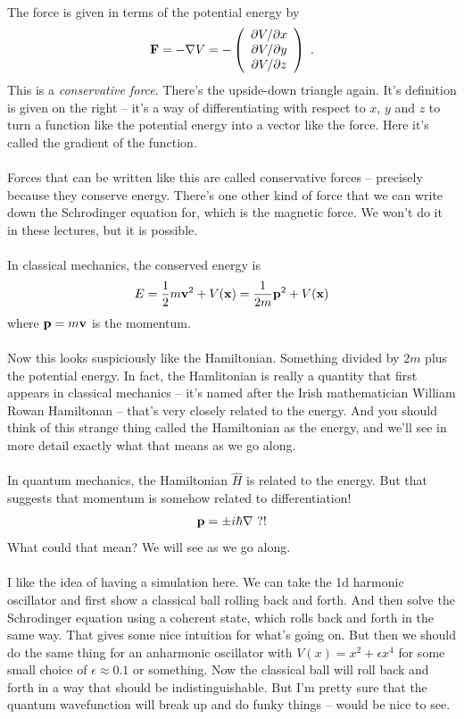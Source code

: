 \documentclass[12pt]{article}
\def\be{\begin{eqnarray}}
\def\ee{\end{eqnarray}}
\newcommand{\nn}{\nonumber}
\newcommand\para{\paragraph{}}
\newcommand{\bx}{{\bf x}}
\begin{document}
\para
{\color{olive} The force is given in terms of the potential energy by
%
\be {\bf F} = -\nabla V = -\left(\begin{array}{c}  \partial V/\partial x \\ \partial V/\partial y  \\ \partial V/\partial z \end{array}\right)\ .\nn\ee
%
This is a {\it conservative force}.}
%
There's the upside-down triangle again. It's definition is given on the right -- it's a way of differentiating with respect to $x$, $y$ and $z$ to turn a function like the potential energy into a vector like the force. Here it's called the gradient of the function. 


\para
Forces that can be written like this are called conservative forces -- precisely because they conserve energy. There's one other kind of force that we can write down the Schrodinger equation for, which is the magnetic force. We won't do it in these lectures, but it is possible. 

\para
{\color{olive} In classical mechanics, the conserved energy is
%
\be E = \frac{1}{2}m{\bf v}^2 + V(\bx) = \frac{1}{2m} {\bf p}^2 + V(\bx)\nn\ee
%
where ${\bf p} = m{\bf v}$ is the momentum}. 

\para
Now this looks suspiciously like the Hamiltonian. Something divided by $2m$ plus the potential energy. In fact, the Hamlitonian is really a quantity that first appears in classical mechanics -- it's named after the Irish mathematician William Rowan Hamiltonan -- that's very closely related to the energy. And you should think of this strange thing called the Hamiltonian as the energy, and we'll see in more detail exactly what that means as we go along.

\para
{\color{olive} In quantum mechanics, the Hamiltonian $\hat{H}$ is related to the energy. But that suggests that momentum is somehow related to differentiation!
\be {\bf p} = \pm i \hbar \nabla \ ?!\nn\ee
%
What could that mean? We will see as we go along.}

\para
{\color{blue} I like the idea of having a simulation here. We can take the 1d harmonic oscillator and first show a classical ball rolling back and forth. And then solve the Schrodinger equation using a coherent state, which rolls back and forth in the same way. That gives some nice intuition for what's going on. But then we should do the same thing for an anharmonic oscillator with $V(x) = x^2 + \epsilon x^4$ for some small choice of $\epsilon\approx 0.1$ or something. Now the classical ball will roll back and forth in a way that should be indistinguishable. But I'm pretty sure that the quantum wavefunction will break up and do funky things -- would be nice to see.}
\end{document}
